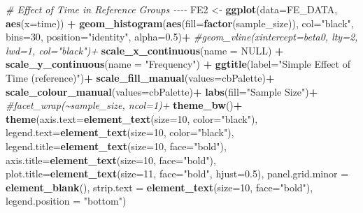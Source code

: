 \documentclass[
]{article}
\newenvironment{Shaded}{\begin{snugshade}}{\end{snugshade}}
\newcommand{\AttributeTok}[1]{\textcolor[rgb]{0.13,0.29,0.53}{#1}}
\newcommand{\CommentTok}[1]{\textcolor[rgb]{0.56,0.35,0.01}{\textit{#1}}}
\newcommand{\ConstantTok}[1]{\textcolor[rgb]{0.56,0.35,0.01}{#1}}
\newcommand{\DecValTok}[1]{\textcolor[rgb]{0.00,0.00,0.81}{#1}}
\newcommand{\FloatTok}[1]{\textcolor[rgb]{0.00,0.00,0.81}{#1}}
\newcommand{\FunctionTok}[1]{\textcolor[rgb]{0.13,0.29,0.53}{\textbf{#1}}}
\newcommand{\NormalTok}[1]{#1}
\newcommand{\OtherTok}[1]{\textcolor[rgb]{0.56,0.35,0.01}{#1}}
\newcommand{\SpecialCharTok}[1]{\textcolor[rgb]{0.81,0.36,0.00}{\textbf{#1}}}
\newcommand{\StringTok}[1]{\textcolor[rgb]{0.31,0.60,0.02}{#1}}
\begin{document}
\begin{Shaded}
\begin{Highlighting}[]
\CommentTok{\# Effect of Time in Reference Groups {-}{-}{-}{-}}
\NormalTok{FE2 }\OtherTok{\textless{}{-}} \FunctionTok{ggplot}\NormalTok{(}\AttributeTok{data=}\NormalTok{FE\_DATA, }\FunctionTok{aes}\NormalTok{(}\AttributeTok{x=}\NormalTok{time)) }\SpecialCharTok{+}
  \FunctionTok{geom\_histogram}\NormalTok{(}\FunctionTok{aes}\NormalTok{(}\AttributeTok{fill=}\FunctionTok{factor}\NormalTok{(sample\_size)), }\AttributeTok{col=}\StringTok{"black"}\NormalTok{, }\AttributeTok{bins=}\DecValTok{30}\NormalTok{,}
                 \AttributeTok{position=}\StringTok{"identity"}\NormalTok{, }\AttributeTok{alpha=}\FloatTok{0.5}\NormalTok{)}\SpecialCharTok{+}
  \CommentTok{\#geom\_vline(xintercept=beta0, lty=2, lwd=1, col="black")+}
  \FunctionTok{scale\_x\_continuous}\NormalTok{(}\AttributeTok{name =} \ConstantTok{NULL}\NormalTok{) }\SpecialCharTok{+}
  \FunctionTok{scale\_y\_continuous}\NormalTok{(}\AttributeTok{name =} \StringTok{"Frequency"}\NormalTok{) }\SpecialCharTok{+}
  \FunctionTok{ggtitle}\NormalTok{(}\AttributeTok{label=}\StringTok{"Simple Effect of Time (reference)"}\NormalTok{)}\SpecialCharTok{+}
  \FunctionTok{scale\_fill\_manual}\NormalTok{(}\AttributeTok{values=}\NormalTok{cbPalette)}\SpecialCharTok{+}
  \FunctionTok{scale\_colour\_manual}\NormalTok{(}\AttributeTok{values=}\NormalTok{cbPalette)}\SpecialCharTok{+}
  \FunctionTok{labs}\NormalTok{(}\AttributeTok{fill=}\StringTok{"Sample Size"}\NormalTok{)}\SpecialCharTok{+}
  \CommentTok{\#facet\_wrap(\textasciitilde{}sample\_size, ncol=1)+}
  \FunctionTok{theme\_bw}\NormalTok{()}\SpecialCharTok{+}
  \FunctionTok{theme}\NormalTok{(}\AttributeTok{axis.text=}\FunctionTok{element\_text}\NormalTok{(}\AttributeTok{size=}\DecValTok{10}\NormalTok{, }\AttributeTok{color=}\StringTok{"black"}\NormalTok{),}
        \AttributeTok{legend.text=}\FunctionTok{element\_text}\NormalTok{(}\AttributeTok{size=}\DecValTok{10}\NormalTok{, }\AttributeTok{color=}\StringTok{"black"}\NormalTok{),}
        \AttributeTok{legend.title=}\FunctionTok{element\_text}\NormalTok{(}\AttributeTok{size=}\DecValTok{10}\NormalTok{, }\AttributeTok{face=}\StringTok{"bold"}\NormalTok{),}
        \AttributeTok{axis.title=}\FunctionTok{element\_text}\NormalTok{(}\AttributeTok{size=}\DecValTok{10}\NormalTok{, }\AttributeTok{face=}\StringTok{"bold"}\NormalTok{),}
        \AttributeTok{plot.title=}\FunctionTok{element\_text}\NormalTok{(}\AttributeTok{size=}\DecValTok{11}\NormalTok{, }\AttributeTok{face=}\StringTok{"bold"}\NormalTok{, }\AttributeTok{hjust=}\FloatTok{0.5}\NormalTok{),}
        \AttributeTok{panel.grid.minor =} \FunctionTok{element\_blank}\NormalTok{(),}
        \AttributeTok{strip.text =} \FunctionTok{element\_text}\NormalTok{(}\AttributeTok{size=}\DecValTok{10}\NormalTok{, }\AttributeTok{face=}\StringTok{"bold"}\NormalTok{),}
        \AttributeTok{legend.position =} \StringTok{"bottom"}\NormalTok{)}


\end{Highlighting}
\end{Shaded}
\end{document}

